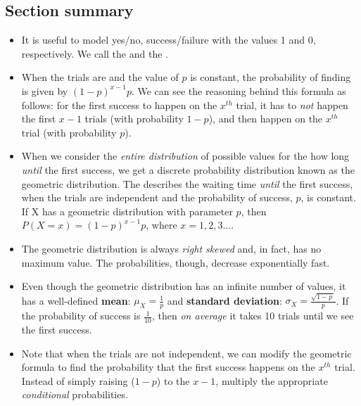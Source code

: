 \B{\newpage}
\subsection*{Section summary}

\begin{itemize}
\item It is useful to model yes/no, success/failure with the values 1 and 0, respectively. We call the and the .

\item When the trials are  and the value of $p$ is constant, the probability of finding  is given by $(1-p)^{x-1}p$.  We can see the reasoning behind this formula as follows:  for the first success to happen on the $x^{th}$ trial, it has to \emph{not} happen the first $x-1$ trials (with probability $1-p$), and then happen on the $x^{th}$ trial (with probability $p$).  

\item When we consider the \emph{entire distribution} of possible values for the how long \emph{until} the first success, we get a discrete probability distribution known as the geometric distribution. The  describes the waiting time \emph{until} the first success, when the trials are independent and the probability of success, $p$, is constant.  If X has a geometric distribution with parameter $p$, then $P(X=x)=(1-p)^{x-1}p$, where $x=1,2,3\dots$.

\item The geometric distribution is always \emph{right skewed} and, in fact, has no maximum value.  The probabilities, though, decrease exponentially fast.

\item Even though the geometric distribution has an infinite number of values, it has a well-defined \textbf{mean}: $\mu_{\scriptscriptstyle{X}}=\frac{1}{p}$ and \textbf{standard deviation}: $\sigma_{\scriptscriptstyle{X}} = \frac{\sqrt{1-p \ }}{p}$.  If the probability of success is $\frac{1}{10}$, then \emph{on average} it takes 10 trials until we see the first success.

\item Note that when the trials are not independent, we can modify the geometric formula to find the probability that the first success happens on the $x^{th}$ trial. Instead of simply raising ($1-p$) to the $x-1$, multiply the appropriate \emph{conditional} probabilities.

\end{itemize}



